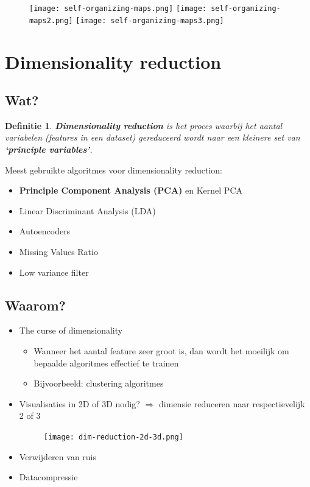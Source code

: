 \documentclass{article}
\newtheorem{theorem}{Definitie}[section]
\begin{document}
\begin{figure}[H]
    \centering
    \texttt{[image: self-organizing-maps.png]}
    \texttt{[image: self-organizing-maps2.png]}
    \texttt{[image: self-organizing-maps3.png]}
\end{figure}

\section{Dimensionality reduction}

\subsection{Wat?}

\begin{theorem}
    \textbf{Dimensionality reduction} is het proces waarbij het aantal variabelen 
    (features in een dataset) gereduceerd wordt naar een kleinere set van \textbf{`principle variables'}.
\end{theorem}

Meest gebruikte algoritmes voor dimensionality reduction:

\begin{itemize}
    \item \textbf{Principle Component Analysis (PCA)} en Kernel PCA
    \item Linear Discriminant Analysis (LDA)
    \item Autoencoders
    \item Missing Values Ratio
    \item Low variance filter
\end{itemize}

\subsection{Waarom?}

\begin{itemize}
    \item The curse of dimensionality
    \begin{itemize}
        \item Wanneer het aantal feature zeer groot is, dan wordt het moeilijk om bepaalde algoritmes effectief te trainen
        \item Bijvoorbeeld: clustering algoritmes
    \end{itemize}
    \item Visualisaties in 2D of 3D nodig? $\Rightarrow$ dimensie reduceren naar respectievelijk 2 of 3
    \begin{figure}[H]
        \centering
        \texttt{[image: dim-reduction-2d-3d.png]}
    \end{figure}
    \item Verwijderen van ruis
    \item Datacompressie
\end{itemize}
\end{document}
